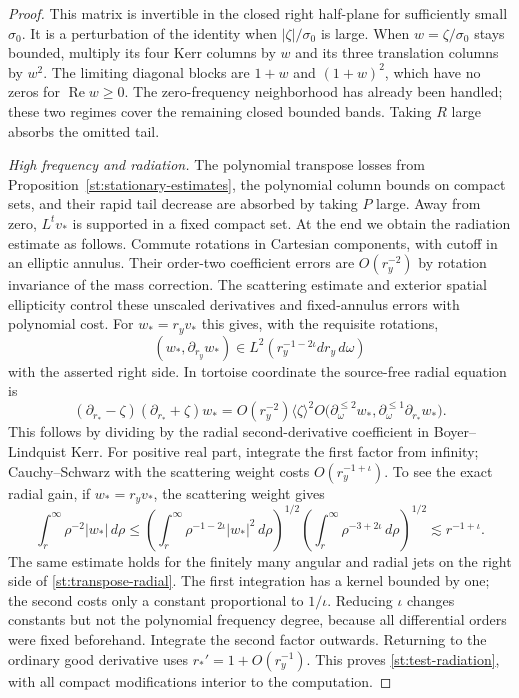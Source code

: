 \begin{proof}
This matrix is invertible in the closed right half-plane for
sufficiently small $\sigma_0$.  It is a perturbation of the
identity when $|\zeta|/\sigma_0$ is large.  When
$w=\zeta/\sigma_0$ stays bounded, multiply its four Kerr
columns by $w$ and its three translation columns by $w^2$.
The limiting diagonal blocks are $1+w$ and $(1+w)^2$,
which have no zeros for $\operatorname{Re}w\geq0$.
The zero-frequency neighborhood has already been handled;
these two regimes cover the remaining closed bounded bands.
Taking $R$ large absorbs the omitted tail.

\emph{High frequency and radiation.}
The polynomial transpose losses from
Proposition~\ref{st:stationary-estimates}, the polynomial
column bounds on compact sets, and their rapid tail decrease
are absorbed by taking $P$ large.  Away from zero,
$L^t v_*$ is supported in a fixed compact set.
At the end we obtain the radiation estimate as follows.
Commute rotations in Cartesian components, with cutoff in an
elliptic annulus.  Their order-two coefficient errors are
$O(r_y^{-2})$ by rotation invariance of the mass correction.
The scattering estimate and exterior spatial ellipticity
control these unscaled derivatives and fixed-annulus errors
with polynomial cost.  For $w_*=r_yv_*$ this gives, with
the requisite rotations,
\[
 (w_*,\partial_{r_y}w_*)\in
     L^2(r_y^{-1-2\iota}dr_y\,d\omega)
\]
with the asserted right side.
In tortoise coordinate the source-free radial equation is
\begin{equation}\label{st:transpose-radial}
 (\partial_{r_*}-\zeta)(\partial_{r_*}+\zeta)w_*
 =O(r_y^{-2})\langle\zeta\rangle^2
       O\bigl(\partial_\omega^{\leq2}w_*,
                \partial_\omega^{\leq1}\partial_{r_*}w_*\bigr).
\end{equation}
This follows by dividing by the radial second-derivative
coefficient in Boyer--Lindquist Kerr.  For positive real part,
integrate the first factor from infinity; Cauchy--Schwarz
with the scattering weight costs $O(r_y^{-1+\iota})$.
To see the exact radial gain, if $w_*=r_yv_*$, the scattering
weight gives
\[
 \int_r^\infty \rho^{-2}|w_*|\,d\rho
 \le
 \left(\int_r^\infty\rho^{-1-2\iota}|w_*|^2\,d\rho\right)^{1/2}
 \left(\int_r^\infty\rho^{-3+2\iota}\,d\rho\right)^{1/2}
 \lesssim r^{-1+\iota}.
\]
The same estimate holds for the finitely many angular and radial jets
on the right side of \eqref{st:transpose-radial}. The first integration
has a kernel bounded by one; the second costs only a constant proportional
to $1/\iota$. Reducing $\iota$ changes constants but not the polynomial
frequency degree, because all differential orders were fixed beforehand.
Integrate the second factor outwards.  Returning to the
ordinary good derivative uses $r_*'=1+O(r_y^{-1})$.
This proves \eqref{st:test-radiation}, with all compact
modifications interior to the computation.


\end{proof}
